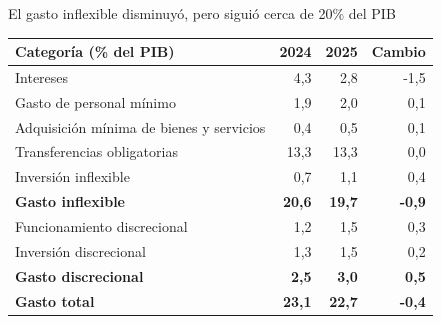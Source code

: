 \begin{frame}{El gasto inflexible disminuyó, pero siguió cerca de 20\% del PIB}
\centering
\small
\begin{tabular}{lrrr}
\toprule
\textbf{Categoría (\% del PIB)} & \textbf{2024} & \textbf{2025} & \textbf{Cambio} \\
\midrule
Intereses                         & 4,3 & 2,8 & -1,5 \\
Gasto de personal mínimo          & 1,9 & 2,0 &  0,1 \\
Adquisición mínima de bienes y servicios & 0,4 & 0,5 & 0,1 \\
Transferencias obligatorias       & 13,3 & 13,3 & 0,0 \\
Inversión inflexible              & 0,7 & 1,1 &  0,4 \\
\midrule
\textbf{Gasto inflexible}         & \textbf{20,6} & \textbf{19,7} & \textbf{-0,9} \\
Funcionamiento discrecional       & 1,2 & 1,5 & 0,3 \\
Inversión discrecional            & 1,3 & 1,5 & 0,2 \\
\textbf{Gasto discrecional}       & \textbf{2,5} & \textbf{3,0} & \textbf{0,5} \\
\midrule
\textbf{Gasto total}              & \textbf{23,1} & \textbf{22,7} & \textbf{-0,4} \\
\bottomrule
\end{tabular}
\end{frame}